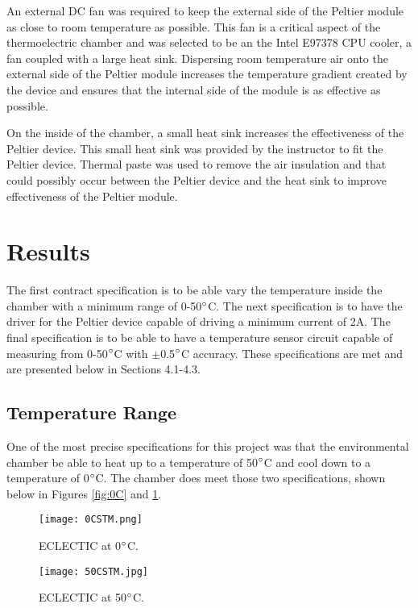 \documentclass[11pt,letter]{article}
\begin{document}
An external DC fan was required to keep the external side of the Peltier module as close to room temperature as possible. This fan is a critical aspect of the thermoelectric chamber and was selected to be an the Intel E97378 CPU cooler, a fan coupled with a large heat sink. Dispersing room temperature air onto the external side of the Peltier module increases the temperature gradient created by the device and ensures that the internal side of the module is as effective as possible.

On the inside of the chamber, a small heat sink increases the effectiveness of the Peltier device. This small heat sink was provided by the instructor to fit the Peltier device. Thermal paste was used to remove the air insulation and that could possibly occur between the Peltier device and the heat sink to improve effectiveness of the Peltier module.

\section{Results}

The first contract specification is to be able vary the temperature inside the chamber with a minimum range of 0-50$\degree$C. The next specification is to have the driver for the Peltier device capable of driving a minimum current of 2A. The final specification is to be able to have a temperature sensor circuit capable of measuring from 0-50$\degree$C with $\pm$0.5$\degree$C accuracy. These specifications are met and are presented below in Sections 4.1-4.3.

\subsection{Temperature Range}

One of the most precise specifications for this project was that the environmental chamber be able to heat up to a temperature of 50$\degree$C and cool down to a temperature of 0$\degree$C. The chamber does meet those two specifications, shown below in Figures \ref{fig:0C} and \ref{fig:50C}. 

\begin{figure}[H]
    \centering
    \begin{minipage}{0.5\textwidth}
        \centering
        \texttt{[image: 0CSTM.png]} %
        \caption{ECLECTIC at 0$\degree$C.}
        \label{fig:0C}
    \end{minipage}\hfill
    \begin{minipage}{0.5\textwidth}
        \centering
        \texttt{[image: 50CSTM.jpg]} %
        \caption{ECLECTIC at 50$\degree$C.}
        \label{fig:50C}
    \end{minipage}
\end{figure}
\end{document}
